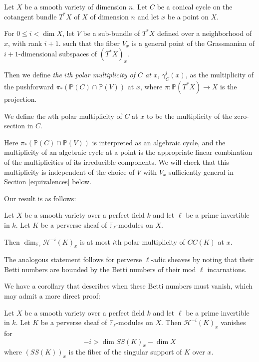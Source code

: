 \begin{defi}
\notready\label{polar-multiplicity} Let $X$ be a smooth variety of dimension $n$. Let $C$ be a conical cycle on the cotangent bundle $T^* X$ of $X$ of dimension $n$ and let $x$ be a point on $X$.

For $0 \leq i< \dim X$, let $V$ be a sub-bundle of $T^* X$ defined over a neighborhood of $x$, with rank $i+1$. such that the fiber $V_x$ is a general point of the Grassmanian of $i+1$-dimensional subspaces of $(T^* X)_x$.

Then we define \emph{the $i$th polar multiplicity of $C$ at $x$},  $\gamma^i_C(x)$, as the multiplicity of the pushforward $\pi_* ( \mathbb P(C) \cap \mathbb P(V))$ at $x$, where $\pi: \mathbb P( T^* X) \to X$ is the projection.

We define {\emph the $n$th polar multiplicity of $C$ at $x$} to be the multiplicity of the zero-section in $C$. \end{defi}

Here $\pi_*( \mathbb P(C) \cap \mathbb P(V))$ is interpreted as an algebraic cycle, and the multiplicity of an algebraic cycle at a point is the appropriate linear combination of the multiplicities of its irreducible components. We will check that this multiplicity is independent of the choice of $V$ with $V_x$ sufficiently general in Section \ref{equivalences} below.

Our result is as follows:

\begin{theorem}
\notready\label{first-Massey-intro} Let $X$ be a smooth variety over a perfect field $k$ and let $\ell$ be a prime invertible in $k$. Let $K$ be a perverse sheaf of $\mathbb F_\ell$-modules on $X$.

Then $\dim_{\mathbb F_\ell} \mathcal H^{-i}(K)_x$ is at most $i$th polar multiplicity of $CC(K)$ at $x$. \end{theorem}

The analogous statement follows for perverse $\ell$-adic sheaves by noting that their Betti numbers are bounded by the Betti numbers of their mod $\ell$ incarnations.

We have a corollary that describes when these Betti numbers must vanish, which may admit a more direct proof:

\begin{corollary}
\notready\label{vanishing-intro} Let $X$ be a smooth variety over a perfect field $k$ and let $\ell$ be a prime invertible in $k$. Let $K$ be a perverse sheaf of $\mathbb F_\ell$-modules on $X$. Then $\mathcal H^{-i} (K)_x$ vanishes for \[ -i> \dim SS(K)_x - \dim X \] where $(SS(K))_x$ is the fiber of the singular support of $K$ over $x$. \end{corollary}

